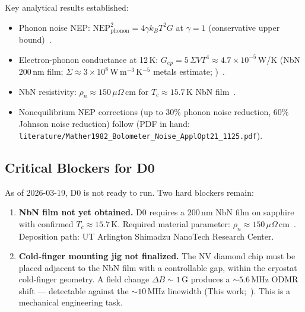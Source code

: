 Key analytical results established:
\begin{itemize}
  \item Phonon noise NEP:
    $\mathrm{NEP}_{\text{phonon}}^2 = 4\gamma k_B T^2 G$
    at $\gamma = 1$ (conservative upper bound)~\cite{Richards1994}. %
  \item Electron-phonon conductance at 12\,K:
    $G_{ep} = 5\,\Sigma V T^4 \approx 4.7 \times 10^{-5}$\,W/K
    (NbN 200\,nm film; $\Sigma \approx 3 \times 10^8$\,W\,m$^{-3}$\,K$^{-5}$
    metals estimate; )~\cite{Richards1994}. %
  \item NbN resistivity: $\rho_n \approx 150\,\mu\Omega\,\text{cm}$
    for $T_c \approx 15.7$\,K NbN film~\cite{Kamlapure2010}. %
  \item Nonequilibrium NEP corrections (up to 30\% phonon noise reduction,
    60\% Johnson noise reduction) follow \cite{Mather1982}
    (PDF in hand: \texttt{literature/Mather1982\_Bolometer\_Noise\_ApplOpt21\_1125.pdf}). %
\end{itemize}

\subsection{Critical Blockers for D0}
\label{sec:d0_blockers}

As of 2026-03-19, D0 is not ready to run. Two hard blockers remain:

\begin{enumerate}
  \item \textbf{NbN film not yet obtained.}
    D0 requires a 200\,nm NbN film on sapphire with confirmed $T_c \approx 15.7$\,K.
    Required material parameter: $\rho_n \approx 150\,\mu\Omega\,\text{cm}$~\cite{Kamlapure2010}. %
    Deposition path: UT Arlington Shimadzu NanoTech Research Center.
  \item \textbf{Cold-finger mounting jig not finalized.}
    The NV diamond chip must be placed adjacent to the NbN film with a controllable gap,
    within the cryostat cold-finger geometry. A field change $\Delta B \sim 1$\,G produces
    a $\sim\!5.6$\,MHz ODMR shift --- detectable against the $\sim\!10$\,MHz linewidth
    (This work;~\cite{Barry2020}). %
    This is a mechanical engineering task.
\end{enumerate}

